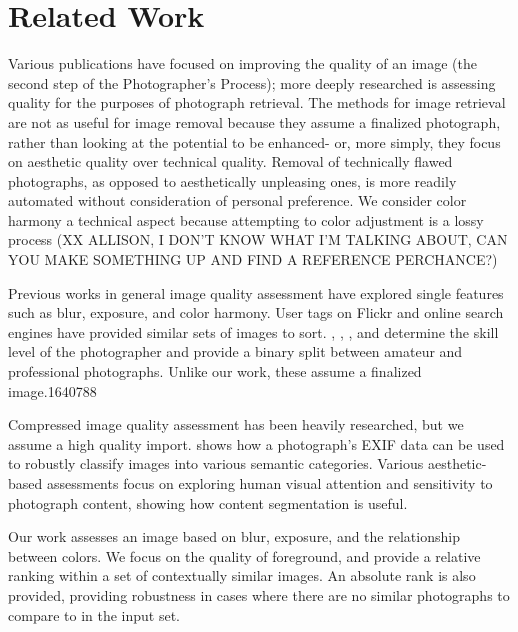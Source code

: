 \documentclass[twocolumn]{article}
\begin{document}
\section{Related Work}
Various publications have focused on improving the quality of an image (the second step of the Photographer's Process)\cite{Bhattacahrya:2010:FPA:1873951.1873990}\cite{Kopf:2008:DPM:1409060.1409069}; more deeply researched is assessing quality for the purposes of photograph retrieval\cite{Yeh:2010:PPR:1873951.1873963}\cite{vanZwol:2010:FEI:1772690.1772788}\cite{springerlink:10.1007/978-3-642-17187-1_57}\cite{Cui:2008:RTG:1459359.1459471}\cite{Chu2010256}. The methods for image retrieval are not as useful for image removal because they assume a finalized photograph, rather than looking at the potential to be enhanced- or, more simply, they focus on aesthetic quality over technical quality. Removal of technically flawed photographs, as opposed to aesthetically unpleasing ones, is more readily automated without consideration of personal preference. We consider color harmony a technical aspect because attempting to color adjustment is a lossy process (XX ALLISON, I DON'T KNOW WHAT I'M TALKING ABOUT, CAN YOU MAKE SOMETHING UP AND FIND A REFERENCE PERCHANCE?)

Previous works in general image quality assessment have explored single features such as blur\cite{springerlink:10.1007/978-3-540-77409-9_26}, exposure\cite{5540170}, and color harmony\cite{COL:COL5080160410}\cite{COL:COL10004}. User tags on Flickr and online search engines have provided similar sets of images to sort\cite{Berg:EECS-2007-13}\cite{Chu2010256}. \cite{springerlink:10.1007/978-3-540-30541-5_25}, \cite{springerlink:10.1007/11744078_23}, \cite{1640788}, and \cite{springerlink:10.1007/978-3-540-88690-7_29} determine the skill level of the photographer and provide a binary split between amateur and professional photographs. Unlike our work, these assume a finalized image.1640788

Compressed image quality assessment has been heavily researched\cite{477498}\cite{1038064}\cite{1284395}, but we assume a high quality import. \cite{1315222} shows how a photograph's EXIF data can be used to robustly classify images into various semantic categories. Various aesthetic-based assessments focus on exploring human visual attention and sensitivity to photograph content\cite{Sun:2009:PAB:1631272.1631351}\cite{1518955}\cite{Pimenov_fastimage}, showing how content segmentation is useful.

Our work assesses an image based on blur, exposure, and the relationship between colors. We focus on the quality of foreground, and provide a relative ranking within a set of contextually similar images. An absolute rank is also provided, providing robustness in cases where there are no similar photographs to compare to in the input set.
\end{document}
